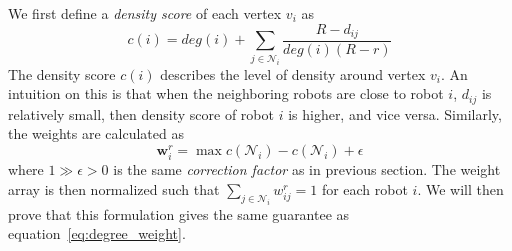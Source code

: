 \documentclass[../main.tex]{subfiles}
\begin{document}
We first define a \textit{density score} of each vertex $v_i$ as
\begin{equation}  \label{eq:density_score}
c(i) = deg(i) + \sum_{j \in \mathcal{N}_i} \frac{R - d_{ij}}{deg(i) (R - r)} 
\end{equation}
The density score $c(i)$ describes the level of density around vertex $v_i$. An intuition on this is that when the neighboring robots are close to robot $i$, $d_{ij}$ is relatively small, then density score of robot $i$ is higher, and vice versa. Similarly, the weights are calculated as
\begin{equation}  \label{eq:distance_weight}
\mathbf{w}^r_i = \max c(\mathcal{N}_i) - c(\mathcal{N}_i) + \epsilon
\end{equation}
where $1 \gg \epsilon >0$ is the same \textit{correction factor} as in previous section. The weight array is then normalized such that $\sum_{j \in \mathcal{N}_i}w_{ij}^r = 1$ for each robot $i$. We will then prove that this formulation gives the same guarantee as equation~\ref{eq:degree_weight}.
\end{document}
